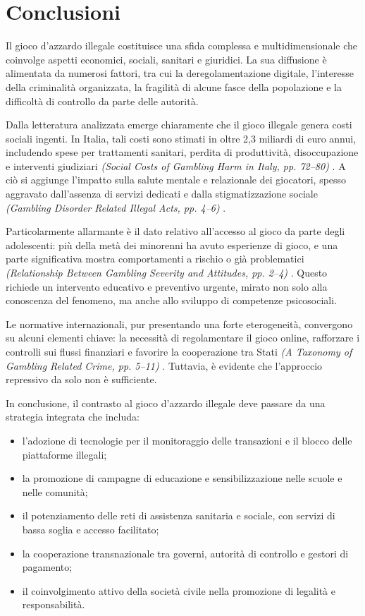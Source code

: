 \documentclass[a4paper,12pt]{article}
\begin{document}
\section{Conclusioni}

Il gioco d’azzardo illegale costituisce una sfida complessa e multidimensionale che coinvolge aspetti economici, sociali, sanitari e giuridici. La sua diffusione è alimentata da numerosi fattori, tra cui la deregolamentazione digitale, l’interesse della criminalità organizzata, la fragilità di alcune fasce della popolazione e la difficoltà di controllo da parte delle autorità.

Dalla letteratura analizzata emerge chiaramente che il gioco illegale genera costi sociali ingenti. In Italia, tali costi sono stimati in oltre 2,3 miliardi di euro annui, includendo spese per trattamenti sanitari, perdita di produttività, disoccupazione e interventi giudiziari \textit{(Social Costs of Gambling Harm in Italy, pp. 72--80)} \cite{lucchini2022socialcosts}. A ciò si aggiunge l’impatto sulla salute mentale e relazionale dei giocatori, spesso aggravato dall’assenza di servizi dedicati e dalla stigmatizzazione sociale \textit{(Gambling Disorder Related Illegal Acts, pp. 4--6)} \cite{gorsane2017illegalacts}.

Particolarmente allarmante è il dato relativo all’accesso al gioco da parte degli adolescenti: più della metà dei minorenni ha avuto esperienze di gioco, e una parte significativa mostra comportamenti a rischio o già problematici \textit{(Relationship Between Gambling Severity and Attitudes, pp. 2--4)} \cite{gori2014adolescentgambling}. Questo richiede un intervento educativo e preventivo urgente, mirato non solo alla conoscenza del fenomeno, ma anche allo sviluppo di competenze psicosociali.

Le normative internazionali, pur presentando una forte eterogeneità, convergono su alcuni elementi chiave: la necessità di regolamentare il gioco online, rafforzare i controlli sui flussi finanziari e favorire la cooperazione tra Stati \textit{(A Taxonomy of Gambling Related Crime, pp. 5--11)} \cite{banks2018taxonomy}. Tuttavia, è evidente che l’approccio repressivo da solo non è sufficiente.

In conclusione, il contrasto al gioco d’azzardo illegale deve passare da una strategia integrata che includa:

\begin{itemize}
    \item l’adozione di tecnologie per il monitoraggio delle transazioni e il blocco delle piattaforme illegali;
    \item la promozione di campagne di educazione e sensibilizzazione nelle scuole e nelle comunità;
    \item il potenziamento delle reti di assistenza sanitaria e sociale, con servizi di bassa soglia e accesso facilitato;
    \item la cooperazione transnazionale tra governi, autorità di controllo e gestori di pagamento;
    \item il coinvolgimento attivo della società civile nella promozione di legalità e responsabilità.
\end{itemize}
\end{document}
